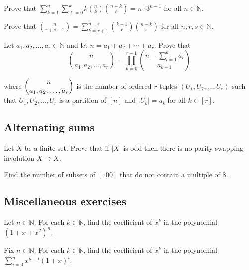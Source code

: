 \begin{chapex}
Prove that $\displaystyle \sum_{k=1}^n \sum_{\ell = 0}^k k \binom{n}{k} \binom{n-k}{\ell} = n \cdot 3^{n-1}$ for all $n \in \mathbb{N}$.
\end{chapex}

\begin{chapex}
Prove that $\displaystyle \binom{n}{r+s+1} = \sum_{k=r+1}^{n-s} \binom{k-1}{r} \binom{n-k}{s}$ for all $n,r,s \in \mathbb{N}$.
\end{chapex}

\begin{chapex}
Let $a_1,a_2,\dots,a_r \in \mathbb{N}$ and let $n = a_1 + a_2 + \cdots + a_r$. Prove that
\[
\binom{n}{a_1,a_2,\dots,a_r} = \prod_{k=0}^{r-1} \binom{n - \sum_{i=1}^k a_i}{a_{k+1}}
\]
\end{chapex}
where $\dbinom{n}{a_1,a_2,\dots,a_r}$ is the number of ordered $r$-tuples $(U_1, U_2, \dots, U_r)$ such that $U_1, U_2, \dots, U_r$ is a partition of $[n]$ and $|U_k| = a_k$ for all $k \in [r]$.

\subsection*{Alternating sums}

\begin{chapex}
Let $X$ be a finite set. Prove that if $|X|$ is odd then there is no parity-swapping involution $X \to X$.
\end{chapex}

\begin{chapex}
Find the number of subsets of $[100]$ that do not contain a multiple of $8$.
\end{chapex}

\subsection*{Miscellaneous exercises}

\begin{chapex}
Let $n \in \mathbb{N}$. For each $k \in \mathbb{N}$, find the coefficient of $x^k$ in the polynomial $(1+x+x^2)^n$.
\end{chapex}

\begin{chapex}
Fix $n \in \mathbb{N}$. For each $k \in \mathbb{N}$, find the coefficient of $x^k$ in the polynomial $\sum_{i=0}^n x^{n-i}(1+x)^i$.
\end{chapex}